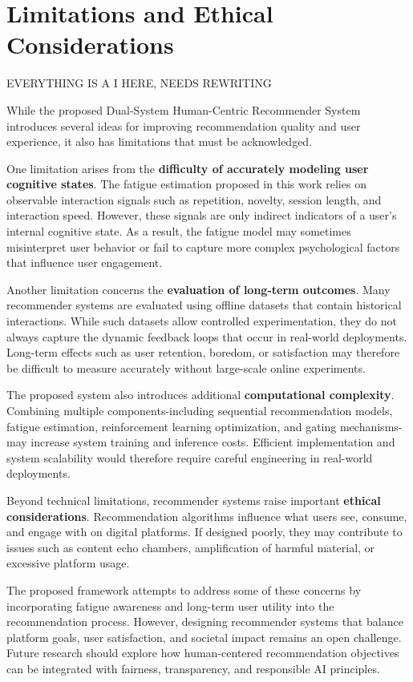 \section{Limitations and Ethical Considerations}

EVERYTHING IS A I HERE, NEEDS REWRITING

While the proposed Dual-System Human-Centric Recommender System introduces several ideas for improving recommendation quality and user experience, it also has limitations that must be acknowledged.

One limitation arises from the \textbf{difficulty of accurately modeling user cognitive states}.
The fatigue estimation proposed in this work relies on observable interaction signals such as repetition, novelty, session length, and interaction speed.
However, these signals are only indirect indicators of a user's internal cognitive state.
As a result, the fatigue model may sometimes misinterpret user behavior or fail to capture more complex psychological factors that influence user engagement.

Another limitation concerns the \textbf{evaluation of long-term outcomes}.
Many recommender systems are evaluated using offline datasets that contain historical interactions.
While such datasets allow controlled experimentation, they do not always capture the dynamic feedback loops that occur in real-world deployments.
Long-term effects such as user retention, boredom, or satisfaction may therefore be difficult to measure accurately without large-scale online experiments.

The proposed system also introduces additional \textbf{computational complexity}.
Combining multiple components-including sequential recommendation models, fatigue estimation, reinforcement learning optimization, and gating mechanisms-may increase system training and inference costs.
Efficient implementation and system scalability would therefore require careful engineering in real-world deployments.

Beyond technical limitations, recommender systems raise important \textbf{ethical considerations}.
Recommendation algorithms influence what users see, consume, and engage with on digital platforms.
If designed poorly, they may contribute to issues such as content echo chambers, amplification of harmful material, or excessive platform usage.

The proposed framework attempts to address some of these concerns by incorporating fatigue awareness and long-term user utility into the recommendation process.
However, designing recommender systems that balance platform goals, user satisfaction, and societal impact remains an open challenge.
Future research should explore how human-centered recommendation objectives can be integrated with fairness, transparency, and responsible AI principles.

